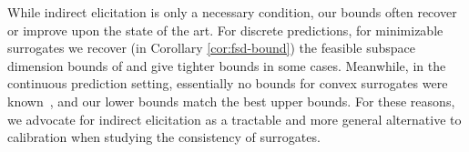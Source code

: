\documentclass{article}
\newcommand{\Comments}{1}
\newcommand{\mynote}[2]{\ifnum\Comments=1\textcolor{#1}{#2}\fi}
\newcommand{\mytodo}[2]{\ifnum\Comments=1%
	\todo[linecolor=#1!80!black,backgroundcolor=#1,bordercolor=#1!80!black]{#2}\fi}
\newcommand{\raf}[1]{\mynote{green!80!blue}{[RF: #1]}}
\newcommand{\raft}[1]{\mytodo{green!20!white}{RF: #1}}
\newcommand{\jessiet}[1]{\mytodo{purple!20!white}{JF: #1}}
\newcommand{\botodo}[1]{\mytodo{blue!20!white}{Bo: #1}}
\newcommand{\reals}{\mathbb{R}}
\newcommand{\Y}{\mathcal{Y}}
\begin{document}
While indirect elicitation is only a necessary condition, our bounds often recover or improve upon the state of the art.
For discrete predictions, for minimizable surrogates we recover (in Corollary \ref{cor:fsd-bound}) the feasible subspace dimension bounds of \citet{ramaswamy2016convex} and give tighter bounds in some cases.
Meanwhile, in the continuous prediction setting, essentially no bounds for convex surrogates were known~\citep{frongillo2018elicitation}, and our lower bounds match the best upper bounds.
For these reasons, we advocate for indirect elicitation as a tractable and more general alternative to calibration when studying the consistency of surrogates.


\end{document}
